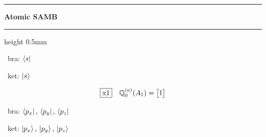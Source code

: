 \documentclass[fleqn,10pt,landscape]{jsarticle}
\begin{document}
\vspace{5mm}
\noindent \rule[0.5mm]{5mm}{0.5mm}\hspace{3mm}\textbf{Atomic SAMB}\hspace{3mm}\leaders\hrule height 0.5mm\hfill\kern0pt
\vspace{3mm}

\vspace{5mm}

\noindent\textbullet\, bra: $\bra{s}$

\noindent\textbullet\, ket: $\ket{s}$

\begin{dmath*}
\fbox{x1}\quad \mathbb{Q}_{0}^{(a)}(A_{1})=\begin{bmatrix} 1 \end{bmatrix}
\end{dmath*}
\vspace{5mm}

\noindent\textbullet\, bra: $\bra{p_{x}},\, \bra{p_{y}},\, \bra{p_{z}}$

\noindent\textbullet\, ket: $\ket{p_{x}},\, \ket{p_{y}},\, \ket{p_{z}}$
\end{document}
